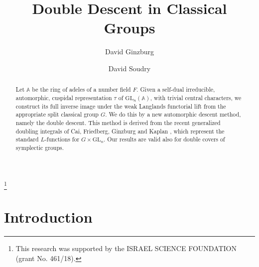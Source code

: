 \documentclass[12pts]{amsart}
\newcommand{\BA}{{\mathbb {A}}}
\newcommand{\GL}{{\mathrm{GL}}}
\begin{document}
\renewcommand{\theequation}{\arabic{equation}}


\title{Double Descent in Classical Groups}

\author{David Ginzburg}

\address{School of Mathematical Sciences, Sackler Faculty of Exact Sciences, Tel-Aviv University, Israel
69978} 


\thanks{This research was supported by the ISRAEL SCIENCE FOUNDATION
	(grant No. 461/18).}

\author{David Soudry}
\address{School of Mathematical Sciences, Sackler Faculty of Exact Sciences, Tel-Aviv University, Israel
69978} 





\begin{abstract}
Let $\BA$ be the ring of adeles of a number field $F$. Given a self-dual irreducible, automorphic, cuspidal representation $\tau$ of $\GL_n(\BA)$, with trivial central characters, we construct its full inverse image under the weak Langlands functorial lift from the appropriate split classical group $G$. We do this by a new automorphic descent method, namely the double descent. This method is derived from the recent generalized doubling integrals of Cai, Friedberg, Ginzburg and Kaplan \cite{CFGK17}, which represent the standard $L$-functions for $G\times \GL_n$. Our results are valid also for double covers of symplectic groups.
\end{abstract}
\maketitle
\setcounter{section}{-1}




\section{Introduction}
\end{document}
